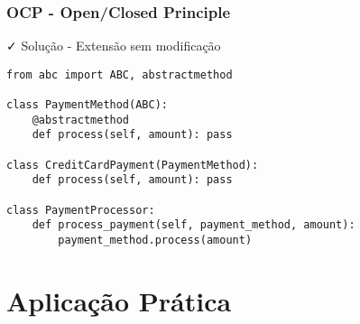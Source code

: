 \documentclass[aspectratio=169]{beamer}
\begin{document}
\begin{frame}[fragile]
\frametitle{OCP - Open/Closed Principle}
\begin{block}{\textcolor{cleangreen}{\faCheck} Solução - Extensão sem modificação}
\scriptsize
\begin{lstlisting}
from abc import ABC, abstractmethod

class PaymentMethod(ABC):
    @abstractmethod
    def process(self, amount): pass

class CreditCardPayment(PaymentMethod):
    def process(self, amount): pass

class PaymentProcessor:
    def process_payment(self, payment_method, amount):
        payment_method.process(amount)
\end{lstlisting}
\end{block}
\end{frame}

\section{Aplicação Prática}
\end{document}
